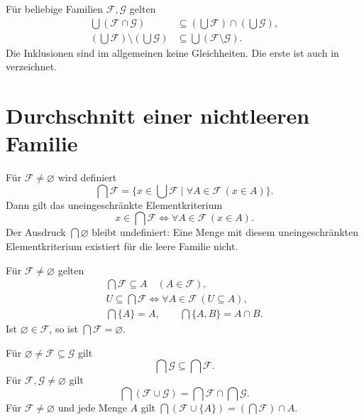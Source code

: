 \begin{theorem}
Für beliebige Familien $\mathcal F,\mathcal G$ gelten
\[
\begin{aligned}
 \bigcup(\mathcal F\cap\mathcal G)
    &\subseteq(\bigcup\mathcal F)\cap(\bigcup\mathcal G),\\
 (\bigcup\mathcal F)\setminus(\bigcup\mathcal G)
    &\subseteq\bigcup(\mathcal F\setminus\mathcal G).
\end{aligned}
\]
Die Inklusionen sind im allgemeinen keine Gleichheiten.
Die erste ist auch in \cite{paulson} verzeichnet.
\end{theorem}

\section{Durchschnitt einer nichtleeren Familie}

\begin{definition}
Für $\mathcal F\ne\varnothing$ wird definiert
\[
 \bigcap\mathcal F
   =\{x\in\bigcup\mathcal F\mid
                         \forall A\in\mathcal F\,(x\in A)\}.
\]
Dann gilt das uneingeschränkte Elementkriterium
\[
 x\in\bigcap\mathcal F
        \Longleftrightarrow\forall A\in\mathcal F\,(x\in A).
\]
Der Ausdruck $\bigcap\varnothing$ bleibt undefiniert:
Eine Menge mit diesem uneingeschränkten Elementkriterium existiert
für die leere Familie nicht. \cite{pila}
\end{definition}

\begin{theorem}
Für $\mathcal F\ne\varnothing$ gelten
\[
\begin{gathered}
 \bigcap\mathcal F\subseteq A\quad(A\in\mathcal F),\\
 U\subseteq\bigcap\mathcal F
       \Longleftrightarrow\forall A\in\mathcal F\,(U\subseteq A),\\
 \bigcap\{A\}=A,\qquad\bigcap\{A,B\}=A\cap B.
\end{gathered}
\]
Ist $\varnothing\in\mathcal F$, so ist
$\bigcap\mathcal F=\varnothing$.
\end{theorem}

\begin{theorem}
Für $\varnothing\ne\mathcal F\subseteq\mathcal G$ gilt
\[
 \bigcap\mathcal G\subseteq\bigcap\mathcal F.
\]
Für $\mathcal F,\mathcal G\ne\varnothing$ gilt
\[
 \bigcap(\mathcal F\cup\mathcal G)
      =\bigcap\mathcal F\cap\bigcap\mathcal G.
\]
Für $\mathcal F\ne\varnothing$ und jede Menge $A$ gilt
$\bigcap(\mathcal F\cup\{A\})=(\bigcap\mathcal F)\cap A$.
\end{theorem}


